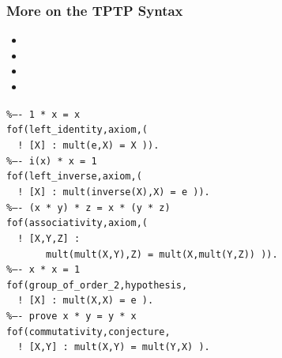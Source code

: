 
\begin{frame}
  \frametitle{More on the TPTP Syntax}

\begin{itemize}
\item {}
\item {}
\item {}
\item {}
\end{itemize}


\begin{small}
\begin{alltt}
{\%----~1~*~x~{=}~x}\\
fof({left\_identity},\alert<4>{axiom},(\\
~~!~[X]~:~mult(e,X)~{=}~X~)).\\
{\%----~i(x)~*~x~{=}~1}\\
fof({left\_inverse},\alert<4>{axiom},(\\
~~!~[X]~:~mult(inverse(X),X)~{=}~e~)).\\
{\%----~(x~*~y)~*~z~{=}~x~*~(y~*~z)}\\
fof({associativity},\alert<4>{axiom},(\\
~~!~[X,Y,Z]~:\\
~~~~~~~mult(mult(X,Y),Z)~{=}~mult(X,mult(Y,Z))~)).\\
{\%----~x~*~x~{=}~1}\\
fof({group\_of\_order\_2},\alert<4>{hypothesis},\\
~~!~[X]~:~mult(X,X)~{=}~e~).\\
{\%----~prove~x~*~y~{=}~y~*~x}\\
fof({commutativity},\alert<4>{conjecture},\\
~~!~[X,Y]~:~mult(X,Y)~{=}~mult(Y,X)~).
\end{alltt}
\end{small}

\end{frame}

